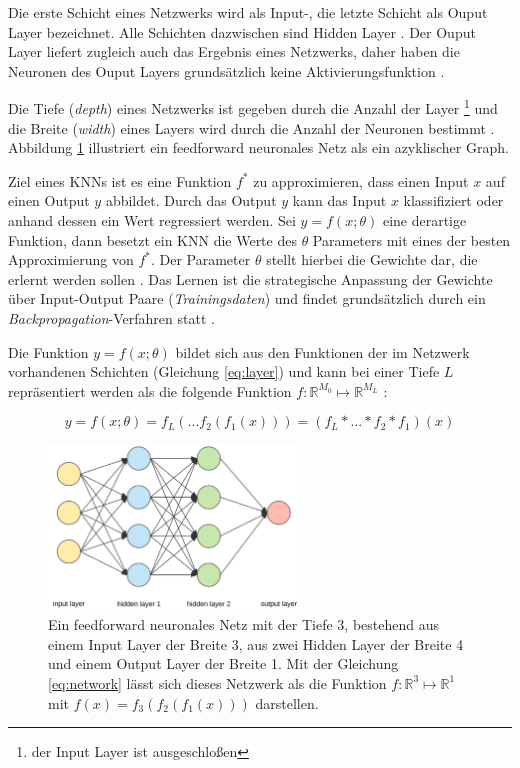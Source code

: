 Die erste Schicht eines Netzwerks wird als Input-, die letzte Schicht als Ouput Layer bezeichnet. Alle Schichten dazwischen sind Hidden Layer \cite{Goodfellow-et-al-2016}. Der Ouput Layer liefert zugleich auch das Ergebnis eines Netzwerks, daher haben die Neuronen des Ouput Layers grundsätzlich keine Aktivierungsfunktion \cite{CS231nConvolutionalNeural}.

Die Tiefe (\textit{depth}) eines Netzwerks ist gegeben durch die Anzahl der Layer \footnote{der Input Layer ist ausgeschloßen} und die Breite (\textit{width}) eines Layers wird durch die Anzahl der Neuronen bestimmt \cite{Goodfellow-et-al-2016}. 
Abbildung \ref{fig:neural_net} illustriert ein feedforward neuronales Netz als ein azyklischer Graph.

Ziel eines KNNs ist es eine Funktion $f^*$ zu approximieren, dass einen Input $x$ auf einen Output $y$ abbildet. Durch das Output $y$ kann das Input $x$ klassifiziert oder anhand dessen ein Wert regressiert werden. Sei $y = f(x; \theta)$ eine derartige Funktion, dann besetzt ein KNN die Werte des $\theta$ Parameters mit eines der besten Approximierung von $f^*$. Der Parameter $\theta$ stellt hierbei die Gewichte dar, die erlernt werden sollen \cite{Goodfellow-et-al-2016}. 
Das Lernen ist die strategische Anpassung der Gewichte über Input-Output Paare (\textit{Trainingsdaten}) und findet grundsätzlich durch ein \textit{Backpropagation}-Verfahren statt \cite{Goodfellow-et-al-2016}. 

Die Funktion $y = f(x; \theta)$ bildet sich aus den Funktionen der im Netzwerk vorhandenen Schichten (Gleichung \ref{eq:layer}) und kann bei einer Tiefe $L$ repräsentiert werden als die folgende Funktion $f :  \mathbb{R}^{M_0} \mapsto \mathbb{R}^{M_L}$ \cite{Goodfellow-et-al-2016, bauckhageInformedMachineLearning}:
 
\begin{equation}
\label{eq:network}
y = f(x; \theta)=  f_L(...f_2(f_1(x))) = (f_L * ... * f_2 * f_1)(x)
\end{equation}

\vspace*{1.5cm}

\begin{figure}[H]
	\centering
	\includegraphics[width=0.6\textwidth]{images/neural_net.png}
	\caption{Ein feedforward neuronales Netz mit der Tiefe 3, bestehend aus einem Input Layer der Breite 3, aus zwei Hidden Layer der Breite 4 und einem Output Layer der Breite 1. Mit der Gleichung \ref{eq:network}  lässt sich dieses Netzwerk als die Funktion $f :  \mathbb{R}^{3} \mapsto \mathbb{R}^{1}$ mit $f(x)=f_3(f_2(f_1(x)))$ darstellen. }
	\label{fig:neural_net}
\end{figure}

